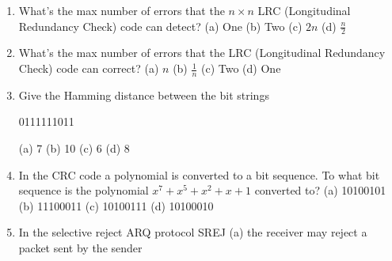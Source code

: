 \documentclass{article}
\begin{document}
\begin{enumerate}
            (a) 40 $Mb$
            \newline
            (b) 2 $Mb$
            \newline
            (c) 4 $Mb$
            \newline
            (d) 10 $Mb$
        \item What's the max number of errors that the $n \times n$ LRC (Longitudinal Redundancy Check) code can detect?
            \newline
            (a) One
            \newline
            (b) Two
            \newline
            (c) $2n$
            \newline
            (d) $\frac{n}{2}$
        \item What's the max number of errors that the LRC (Longitudinal Redundancy Check) code can correct?
            \newline
            (a) $n$
            \newline
            (b) $\frac{1}{n}$
            \newline
            (c) Two
            \newline
            (d) One 
        \item Give the Hamming distance between the bit strings
            \begin{center}
                0111111011
            \end{center}
            (a) 7
            \newline
            (b) 10
            \newline
            (c) 6
            \newline
            (d) 8
        \item In the CRC code a polynomial is converted to a bit sequence. To what bit sequence is the polynomial $x^7 + x^5 + x^2 + x +1$ converted to?
            \newline
            (a) 10100101
            \newline
            (b) 11100011
            \newline
            (c) 10100111
            \newline
            (d) 10100010
        \item In the selective reject ARQ protocol SREJ
            \newline
            (a) the receiver may reject a packet sent by the sender

\end{enumerate}
\end{document}
